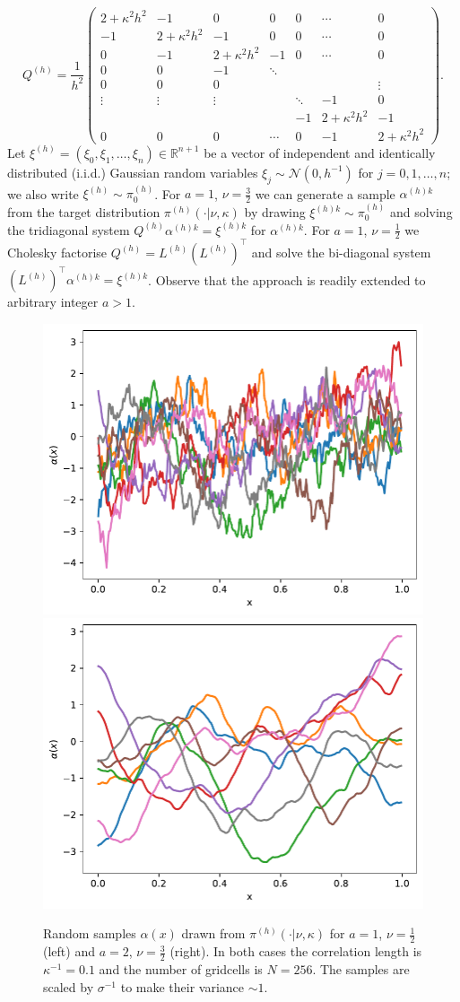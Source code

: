 \documentclass[11pt]{article}
\begin{document}
\begin{equation}
    Q^{(h)} = \frac{1}{h^2}\begin{pmatrix}
        2 +\kappa^2h^2 & -1 & 0 & 0 & 0&\cdots & 0\\
            -1 & 2+\kappa^2h^2 & - 1  & 0 &0& \cdots & 0\\
            0 & -1 & 2+\kappa^2h^2 & - 1 & 0 & \cdots & 0\\
            0 & 0 & -1& \ddots\\
            0&0&0&&&&\vdots\\
            \vdots & \vdots &\vdots&&\ddots &-1 & 0\\
             &  &  & & -1 &  2+\kappa^2h^2 & -1\\
            0 & 0 & 0 & \cdots &0 &  -1  & 2+\kappa^2h^2
    \end{pmatrix}.
\end{equation}
Let $\xi^{(h)}=(\xi_0,\xi_1,\dots,\xi_n)\in\mathbb{R}^{n+1}$ be a vector of independent and identically distributed (i.i.d.) Gaussian random variables $\xi_j\sim\mathcal{N}(0,h^{-1})$ for $j=0,1,\dots,n$; we also write $\xi^{(h)}\sim \pi_0^{(h)}$. For $a=1$, $\nu=\frac{3}{2}$ we can generate a sample $\alpha^{(h)k}$ from the target distribution $\pi^{(h)}(\cdot|\nu,\kappa)$ by drawing $\xi^{(h)k}\sim \pi_0^{(h)}$ and solving the tridiagonal system $Q^{(h)}\alpha^{(h)k}=\xi^{(h)k}$ for $\alpha^{(h)k}$. For $a=1$, $\nu=\frac{1}{2}$ we Cholesky factorise $Q^{(h)}=L^{(h)}(L^{(h)})^\top$ and solve the bi-diagonal system $(L^{(h)})^\top\alpha^{(h)k}= \xi^{(h)k}$. Observe that the approach is readily extended to arbitrary integer $a>1$.
\begin{figure}
    \begin{center}
        \includegraphics[width=0.45\linewidth]{figures/samples_nu0_5.pdf}
        \hfill
        \includegraphics[width=0.45\linewidth]{figures/samples_nu1_5.pdf}
    \end{center}
    \caption{Random samples $\alpha(x)$ drawn from $\pi^{(h)}(\cdot|\nu,\kappa)$ for $a=1$, $\nu=\frac{1}{2}$ (left) and $a=2$, $\nu=\frac{3}{2}$ (right). In both cases the correlation length is $\kappa^{-1}=0.1$ and the number of gridcells is $N=256$. The samples are scaled by $\sigma^{-1}$ to make their variance $\sim 1$.}
    \label{fig:random_samples}
\end{figure}
\end{document}
